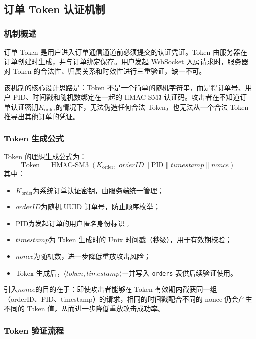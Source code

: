 \subsection{订单 Token 认证机制}
\label{subsec:token}

\subsubsection*{机制概述}

订单 Token 是用户进入订单通信通道前必须提交的认证凭证。Token 由服务器在订单创建时生成，并与订单绑定保存。用户发起 WebSocket 入房请求时，服务器对 Token 的合法性、归属关系和时效性进行三重验证，缺一不可。

该机制的核心设计思路是：Token 不是一个简单的随机字符串，而是将订单号、用户 PID、时间戳和随机数绑定在一起的 HMAC-SM3 认证码。攻击者在不知道订单认证密钥$K_{\mathrm{order}}$的情况下，无法伪造任何合法 Token，也无法从一个合法 Token 推导出其他订单的凭证。

\subsubsection*{Token 生成公式}

Token 的理想生成公式为：
\[
  \mathrm{Token} = \operatorname{HMAC\text{-}SM3}\!\left(K_{\mathrm{order}},\; \mathit{orderID} \| \mathrm{PID} \| \mathit{timestamp} \| \mathit{nonce}\right)
\]
其中：
\begin{itemize}[leftmargin=2em]
  \item$K_{\mathrm{order}}$为系统订单认证密钥，由服务端统一管理；
  \item$\mathit{orderID}$为随机 UUID 订单号，防止顺序枚举；
  \item$\mathrm{PID}$为发起订单的用户匿名身份标识；
  \item$\mathit{timestamp}$为 Token 生成时的 Unix 时间戳（秒级），用于有效期校验；
  \item$\mathit{nonce}$为随机数，进一步降低重放攻击风险；
  \item Token 生成后，$\langle\mathit{token}, \mathit{timestamp}\rangle$一并写入 \texttt{orders} 表供后续验证使用。
\end{itemize}

引入$\mathit{nonce}$的目的在于：即使攻击者能够在 Token 有效期内截获同一组（orderID、PID、timestamp）的请求，相同的时间戳配合不同的 nonce 仍会产生不同的 Token 值，从而进一步降低重放攻击成功率。

\subsubsection*{Token 验证流程}

